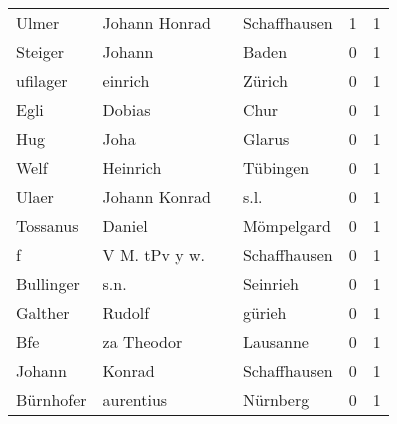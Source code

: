 \documentclass[10pt,a4paper,landscape]{article}
\begin{document}
\begin{longtable}{llllrr}
                    Ulmer &                      Johann Honrad &             &                                Schaffhausen &          1 &         1 \\
                  Steiger &                             Johann &             &                                       Baden &          0 &         1 \\
                 ufilager &                            einrich &             &                                      Zürich &          0 &         1 \\
                     Egli &                             Dobias &             &                                        Chur &          0 &         1 \\
                      Hug &                               Joha &             &                                      Glarus &          0 &         1 \\
                     Welf &                           Heinrich &             &                                    Tübingen &          0 &         1 \\
                    Ulaer &                      Johann Konrad &             &                                        s.l. &          0 &         1 \\
                 Tossanus &                             Daniel &             &                                  Mömpelgard &          0 &         1 \\
                        f &                      V M. tPv y w. &             &                                Schaffhausen &          0 &         1 \\
                Bullinger &                               s.n. &             &                                    Seinrieh &          0 &         1 \\
                  Galther &                             Rudolf &             &                                      gürieh &          0 &         1 \\
                      Bfe &                         za Theodor &             &                                    Lausanne &          0 &         1 \\
                   Johann &                             Konrad &             &                                Schaffhausen &          0 &         1 \\
                Bürnhofer &                          aurentius &             &                                    Nürnberg &          0 &         1 \\

\end{longtable}
\end{document}
